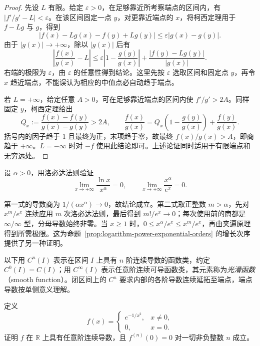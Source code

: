 \begin{proof}
先设 $L$ 有限。给定 $\varepsilon>0$，在足够靠近所考察端点的区间内，有 $|f'/g'-L|<\varepsilon$。在该区间固定一点 $y$，对更靠近端点的 $x$，将柯西定理用于 $f-Lg$ 与 $g$，得到
\[
    |f(x)-Lg(x)-f(y)+Lg(y)|
    \leq\varepsilon|g(x)-g(y)|.
\]
由于 $|g(x)|\to+\infty$，除以 $|g(x)|$ 后有
\[
    \left|\frac{f(x)}{g(x)}-L\right|
    \leq\varepsilon\left|1-\frac{g(y)}{g(x)}\right|
       +\frac{|f(y)-Lg(y)|}{|g(x)|}.
\]
右端的极限为 $\varepsilon$，由 $\varepsilon$ 的任意性得到结论。这里先按 $\varepsilon$ 选取区间和固定点 $y$，再令 $x$ 趋近端点，不能误认为相应的中值点必自动趋于端点。

若 $L=+\infty$，给定任意 $A>0$，可在足够靠近端点的区间内使 $f'/g'>2A$。同样固定 $y$，柯西定理给出
\[
    Q_x:=\frac{f(x)-f(y)}{g(x)-g(y)}>2A,
    \qquad
    \frac{f(x)}{g(x)}
    =Q_x\left(1-\frac{g(y)}{g(x)}\right)+\frac{f(y)}{g(x)}.
\]
括号内的因子趋于 $1$ 且最终为正，末项趋于零，故最终 $f(x)/g(x)>A$，即商趋于 $+\infty$。$L=-\infty$ 时对 $-f$ 使用此结论即可。上述论证同时适用于有限端点和无穷远处。
\end{proof}

\begin{example}
\label{ex:lhopital-growth-rates}
设 $\alpha>0$，用洛必达法则验证
\[
    \lim_{x\to+\infty}\frac{\ln x}{x^\alpha}=0,
    \qquad
    \lim_{x\to+\infty}\frac{x^\alpha}{e^x}=0.
\]
\end{example}

\begin{solve}
第一式的导数商为 $1/(\alpha x^\alpha)\to0$，故结论成立。第二式取正整数 $m>\alpha$，先对 $x^m/e^x$ 连续应用 $m$ 次洛必达法则，最后得到 $m!/e^x\to0$；每次使用前的商都是 $\infty/\infty$ 型，分母导数始终非零。当 $x\geq1$ 时，$0\leq x^\alpha/e^x\leq x^m/e^x$，再由夹逼原理得到所需极限。这为命题~\ref{prop:logarithm-power-exponential-orders} 的增长次序提供了另一种证明。
\end{solve}

以下用 $C^n(I)$ 表示在区间 $I$ 上具有 $n$ 阶连续导数的函数类，约定 $C^0(I)=C(I)$；用 $C^\infty(I)$ 表示任意阶连续可导函数类，其元素称为\emph{光滑函数}（smooth function）。闭区间上的 $C^n$ 要求内部的各阶导数连续延拓至端点，端点导数按单侧意义理解。

\begin{example}
\label{ex:smooth-flat-exponential-function}
定义
\[
    f(x)=
    \begin{cases}
        e^{-1/x^2},&x\neq0,\\
        0,&x=0.
    \end{cases}
\]
证明 $f$ 在 $\mathbb{R}$ 上具有任意阶连续导数，且 $f^{(n)}(0)=0$ 对一切非负整数 $n$ 成立。
\end{example}

